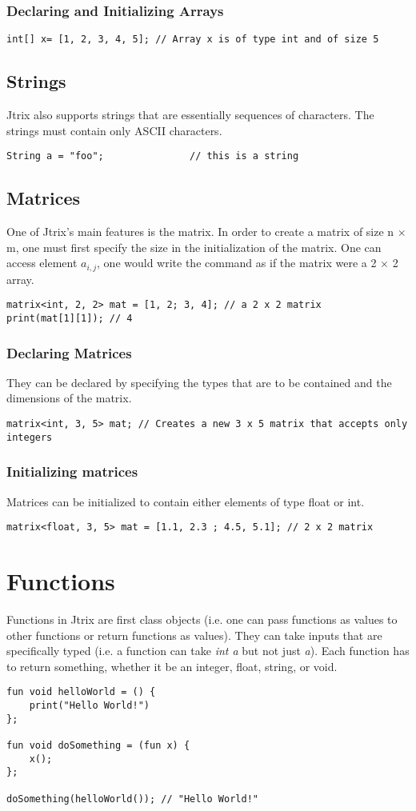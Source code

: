 \documentclass[titlepage, 12pt]{report}
\begin{document}
\subsubsection{Declaring and Initializing Arrays}
\begin{lstlisting}
int[] x= [1, 2, 3, 4, 5]; // Array x is of type int and of size 5
\end{lstlisting}
\subsection{Strings}
Jtrix also supports strings that are essentially sequences of characters. The strings must contain only ASCII characters.
\begin{lstlisting}
String a = "foo";				// this is a string
\end{lstlisting}
\subsection{Matrices}
One of Jtrix's main features is the matrix. In order to create a matrix of size n $\times$ m, one must first specify the size in the initialization of the matrix. One can access element $a_{i,j}$, one would write the command as if the matrix were a 2 $\times$ 2 array.
\begin{lstlisting}
matrix<int, 2, 2> mat = [1, 2; 3, 4]; // a 2 x 2 matrix
print(mat[1][1]); // 4 
\end{lstlisting}
\subsubsection{Declaring Matrices}
They can be declared by specifying the types that are to be contained and the dimensions of the matrix.
\begin{lstlisting}
matrix<int, 3, 5> mat; // Creates a new 3 x 5 matrix that accepts only integers
\end{lstlisting}
\subsubsection{Initializing matrices}
Matrices can be initialized to contain either elements of type float or int. 
\begin{lstlisting}
matrix<float, 3, 5> mat = [1.1, 2.3 ; 4.5, 5.1]; // 2 x 2 matrix
\end{lstlisting}

\section{Functions}
Functions in Jtrix are first class objects (i.e. one can pass functions as values to other functions or return functions as values). They can take inputs that are specifically typed (i.e. a function can take \textit{int a} but not just \textit{a}). Each function has to return something, whether it be an integer, float, string, or void.
\begin{lstlisting}
fun void helloWorld = () {
	print("Hello World!")
};

fun void doSomething = (fun x) {
	x();
};

doSomething(helloWorld()); // "Hello World!"
\end{lstlisting}
\end{document}
